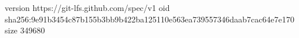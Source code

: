version https://git-lfs.github.com/spec/v1
oid sha256:9e91b3454c87b155b3bb9b422ba125110e563ea739557346daab7cac64e7e170
size 349680
